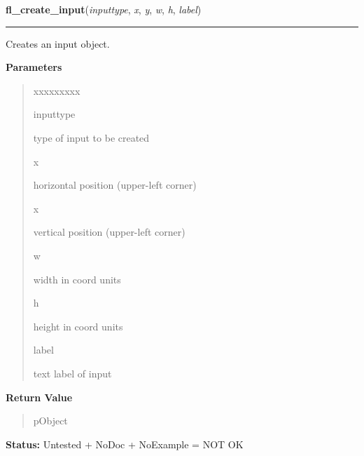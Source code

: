 \hspace{.8\funcindent}\begin{boxedminipage}{\funcwidth}

    \raggedright \textbf{fl\_create\_input}(\textit{inputtype}, \textit{x}, \textit{y}, \textit{w}, \textit{h}, \textit{label})

    \vspace{-1.5ex}

    \rule{\textwidth}{0.5\fboxrule}
\setlength{\parskip}{2ex}
    Creates an input object.

\setlength{\parskip}{1ex}
      \textbf{Parameters}
      \vspace{-1ex}

      \begin{quote}
        \begin{Ventry}{xxxxxxxxx}

          \item[inputtype]

          type of input to be created

          \item[x]

          horizontal position (upper-left corner)

          \item[x]

          vertical position (upper-left corner)

          \item[w]

          width in coord units

          \item[h]

          height in coord units

          \item[label]

          text label of input

        \end{Ventry}

      \end{quote}

      \textbf{Return Value}
    \vspace{-1ex}

      \begin{quote}
      pObject

      \end{quote}

\textbf{Status:} Untested + NoDoc + NoExample = NOT OK



    \end{boxedminipage}


